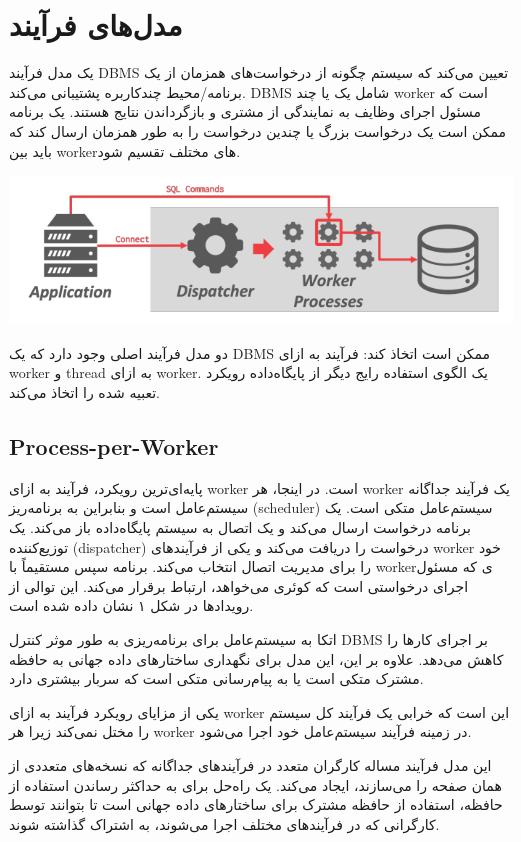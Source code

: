 \section{مدل‌های فرآیند}
یک مدل فرآیند DBMS تعیین می‌کند که سیستم چگونه از درخواست‌های همزمان از یک برنامه/محیط چندکاربره پشتیبانی می‌کند. DBMS شامل یک یا چند worker است که مسئول اجرای وظایف به نمایندگی از مشتری و بازگرداندن نتایج هستند. یک برنامه ممکن است یک درخواست بزرگ یا چندین درخواست را به طور همزمان ارسال کند که باید بین workerهای مختلف تقسیم شود.

\qquad\qquad\qquad	\includegraphics[width=0.7\linewidth]{screenshot009}

دو مدل فرآیند اصلی وجود دارد که یک DBMS ممکن است اتخاذ کند: فرآیند به ازای worker و thread به ازای worker. یک الگوی استفاده رایج دیگر از پایگاه‌داده رویکرد تعبیه شده را اتخاذ می‌کند.

\subsection{Process-per-Worker}
پایه‌ای‌ترین رویکرد، فرآیند به ازای worker است. در اینجا، هر worker یک فرآیند جداگانه سیستم‌عامل است و بنابراین به برنامه‌ریز (scheduler) سیستم‌عامل متکی است. یک برنامه درخواست ارسال می‌کند و یک اتصال به سیستم پایگاه‌داده باز می‌کند. یک توزیع‌کننده (dispatcher) درخواست را دریافت می‌کند و یکی از فرآیندهای worker خود را برای مدیریت اتصال انتخاب می‌کند. برنامه سپس مستقیماً با workerی که مسئول اجرای درخواستی است که کوئری می‌خواهد، ارتباط برقرار می‌کند. این توالی از رویدادها در شکل ۱ نشان داده شده است.

اتکا به سیستم‌عامل برای برنامه‌ریزی به طور موثر کنترل DBMS بر اجرای کارها را کاهش می‌دهد. علاوه بر این، این مدل برای نگهداری ساختارهای داده جهانی به حافظه مشترک متکی است یا به پیام‌رسانی متکی است که سربار بیشتری دارد.

یکی از مزایای رویکرد فرآیند به ازای worker این است که خرابی یک فرآیند کل سیستم را مختل نمی‌کند زیرا هر worker در زمینه فرآیند سیستم‌عامل خود اجرا می‌شود.

این مدل فرآیند مساله کارگران متعدد در فرآیندهای جداگانه که نسخه‌های متعددی از همان صفحه را می‌سازند، ایجاد می‌کند. یک راه‌حل برای به حداکثر رساندن استفاده از حافظه، استفاده از حافظه مشترک برای ساختارهای داده جهانی است تا بتوانند توسط کارگرانی که در فرآیندهای مختلف اجرا می‌شوند، به اشتراک گذاشته شوند.

